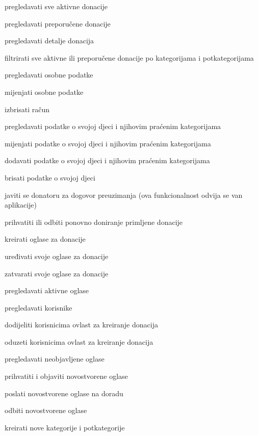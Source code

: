\begin{packed_enum}
\begin{packed_enum}
				\end{packed_enum}

				\item  {}
				
				\begin{packed_enum}
					
					\item pregledavati sve aktivne donacije
					\item pregledavati preporučene donacije
					\item pregledavati detalje donacija
					\item filtrirati sve aktivne ili preporučene donacije po kategorijama i potkategorijama
					\item pregledavati osobne podatke
					\item mijenjati osobne podatke
					\item izbrisati račun
					\item pregledavati podatke o svojoj djeci i njihovim praćenim kategorijama
					\item mijenjati podatke o svojoj djeci i njihovim praćenim kategorijama
					\item dodavati podatke o svojoj djeci i njihovim praćenim kategorijama
					\item brisati podatke o svojoj djeci
					\item javiti se donatoru za dogovor preuzimanja (ova funkcionalnost odvija se van aplikacije)
					\item prihvatiti ili odbiti ponovno doniranje primljene donacije
					\item kreirati oglase za donacije
					\item uređivati svoje oglase za donacije 
					\item zatvarati svoje oglase za donacije
					
				\end{packed_enum}

				\item  {}
				
				\begin{packed_enum}
					
					\item pregledavati aktivne oglase 
					\item pregledavati korisnike
					\item dodijeliti korisnicima ovlast za kreiranje donacija
					\item oduzeti korisnicima ovlast za kreiranje donacija
					\item pregledavati neobjavljene oglase
					\item prihvatiti i objaviti novostvorene oglase
					\item poslati novostvorene oglase na doradu
					\item odbiti novostvorene oglase
					\item kreirati nove kategorije i potkategorije
					

\end{packed_enum}
\end{packed_enum}
